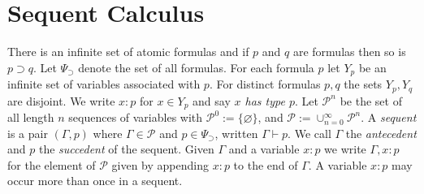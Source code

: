 \documentclass[english,letter paper,12pt,leqno]{article}
\theoremstyle{example}
\numberwithin{equation}{section}
\newcommand{\call}[1]{\mathcal{#1}}
\def\imp{\supset}
\begin{document}


\section{Sequent Calculus}\label{section:sequent_calc}


There is an infinite set of atomic formulas and if $p$ and $q$ are formulas then so is $p \imp q$. Let $\Psi_\imp$ denote the set of all formulas. For each formula $p$ let $Y_p$ be an infinite set of variables associated with $p$. For distinct formulas $p,q$ the sets $Y_p, Y_q$ are disjoint. We write $x : p$ for $x \in Y_p$ and say \emph{$x$ has type $p$}. Let $\call{P}^n$ be the set of all length $n$ sequences of variables with $\call{P}^0 := \lbrace \varnothing \rbrace$, and $\call{P} := \cup_{n = 0}^\infty \call{P}^n$. A \emph{sequent} is a pair $(\Gamma,p)$ where $\Gamma \in \call{P}$ and $p \in \Psi_\imp$, written $\Gamma \vdash p$. We call $\Gamma$ the \emph{antecedent} and $p$ the \emph{succedent} of the sequent. Given $\Gamma$ and a variable $x:p$ we write $\Gamma, x:p$ for the element of $\call{P}$ given by appending $x:p$ to the end of $\Gamma$. A variable $x:p$ may occur more than once in a sequent.
\end{document}
